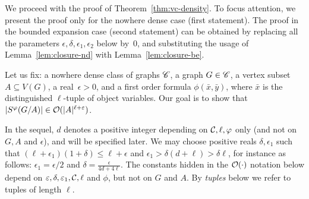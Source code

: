 We proceed with the proof of Theorem~\ref{thm:vc-density}.  To focus
attention, we present the proof only for the nowhere dense case (first
statement). The proof in the bounded expansion case (second statement)
can be obtained by replacing all the parameters
$\epsilon,\delta,\epsilon_1,\epsilon_2$ below by~$0$, and substituting
the usage of Lemma~\ref{lem:closure-nd} with
Lemma~\ref{lem:closure-be}.

Let us fix: a nowhere dense class of graphs $\CCC$, a graph
$G\in \CCC$, a vertex subset $A\subseteq V(G)$, a \mbox{real $\epsilon>0$},
and a first order formula $\phi(\bar x,\bar y)$, where $\bar x$ is the
distinguished $\ell$-tuple of object variables.  Our goal is to show
that $|S^\phi(G/A)|\in \Oof(|A|^{\ell+\epsilon})$.
 	   
In the sequel, $d$ denotes a positive integer depending on
${\cal C},\ell,\phi$ only (and not on $G, A$ and $\epsilon$), and will
be specified later. We may choose positive reals $\delta,\epsilon_1$
such that $(\ell+\epsilon_1)(1+\delta) \le \ell+\epsilon$ and
$\epsilon_1>\delta(d+\ell)> \delta\ell$, for instance as follows:
$\epsilon_1=\epsilon/2$ and $\delta=\frac{\epsilon}{4d+4\ell}$.  The
constants hidden in the $\Oof(\cdot)$ notation below depend on
$\epsilon,\delta,\epsilon_1,\cal C, \ell$ and $\phi$, but not on $G$
and $A$.  By \emph{tuples} below we refer to tuples of length $\ell$.

